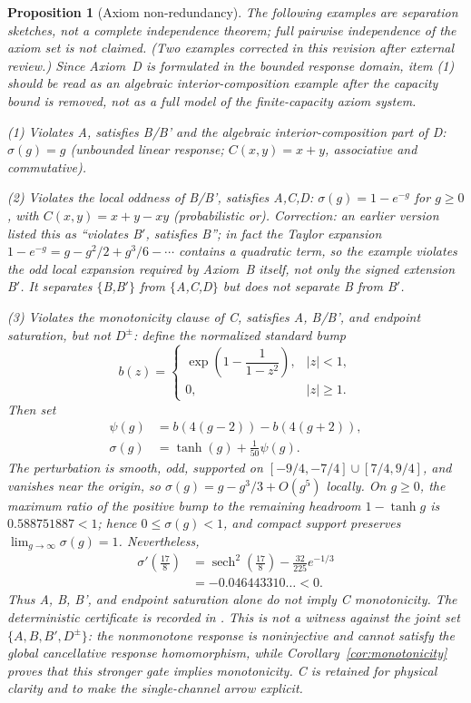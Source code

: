 \documentclass[aps,prd,twocolumn,superscriptaddress,nofootinbib]{revtex4-2}
\newtheorem{proposition}{Proposition}
\begin{document}
\begin{proposition}[Axiom non-redundancy]
\label{prop:independence}
The following examples are \emph{separation sketches}, not a complete independence theorem; full pairwise independence of the axiom set is not claimed. \emph{(Two examples corrected in this revision after external review.)} Since Axiom~D is formulated in the bounded response domain, item (1) should be read as an algebraic interior-composition example after the capacity bound is removed, not as a full model of the finite-capacity axiom system.

\textit{(1) Violates A, satisfies B/B' and the algebraic interior-composition part of D:} $\sigma(g) = g$ (unbounded linear response; $C(x,y) = x+y$, associative and commutative).

\textit{(2) Violates the local oddness of B/B', satisfies A,C,D:} $\sigma(g) = 1 - e^{-g}$ for $g \geq 0$, with $C(x,y) = x + y - xy$ (probabilistic or). \emph{Correction:} an earlier version listed this as ``violates B$'$, satisfies B''; in fact the Taylor expansion $1-e^{-g} = g - g^2/2 + g^3/6 - \cdots$ contains a quadratic term, so the example violates the odd local expansion required by Axiom~B itself, not only the signed extension B$'$. It separates $\{$B,B$'\}$ from $\{$A,C,D$\}$ but does not separate B from B$'$.

\textit{(3) Violates the monotonicity clause of C, satisfies A, B/B', and endpoint saturation, but not $D^\pm$:} define the normalized standard bump
\[
 b(z)=\begin{cases}\exp\!\left(1-\dfrac{1}{1-z^2}\right),& |z|<1,\\[0.3em]0,&|z|\geq1.\end{cases}
\]
Then set
\[
 \begin{aligned}
 \psi(g)&=b(4(g-2))-b(4(g+2)),\\
 \sigma(g)&=\tanh(g)+\frac{1}{50}\psi(g).
 \end{aligned}
\]
The perturbation is smooth, odd, supported on $[-9/4,-7/4]\cup[7/4,9/4]$, and vanishes near the origin, so $\sigma(g)=g-g^3/3+O(g^5)$ locally. On $g\geq0$, the maximum ratio of the positive bump to the remaining headroom $1-\tanh g$ is $0.588751887<1$; hence $0\leq\sigma(g)<1$, and compact support preserves $\lim_{g\to\infty}\sigma(g)=1$. Nevertheless,
\[
 \begin{aligned}
 \sigma'\!\left(\frac{17}{8}\right)
 &=\operatorname{sech}^2\!\left(\frac{17}{8}\right)
   -\frac{32}{225}e^{-1/3}\\
 &=-0.046443310\ldots<0.
 \end{aligned}
\]
Thus A, B, B', and endpoint saturation alone do not imply C monotonicity. The deterministic certificate is recorded in . This is not a witness against the joint set $\{A,B,B',D^\pm\}$: the nonmonotone response is noninjective and cannot satisfy the global cancellative response homomorphism, while Corollary~\ref{cor:monotonicity} proves that this stronger gate implies monotonicity. C is retained for physical clarity and to make the single-channel arrow explicit.


\end{proposition}
\end{document}

